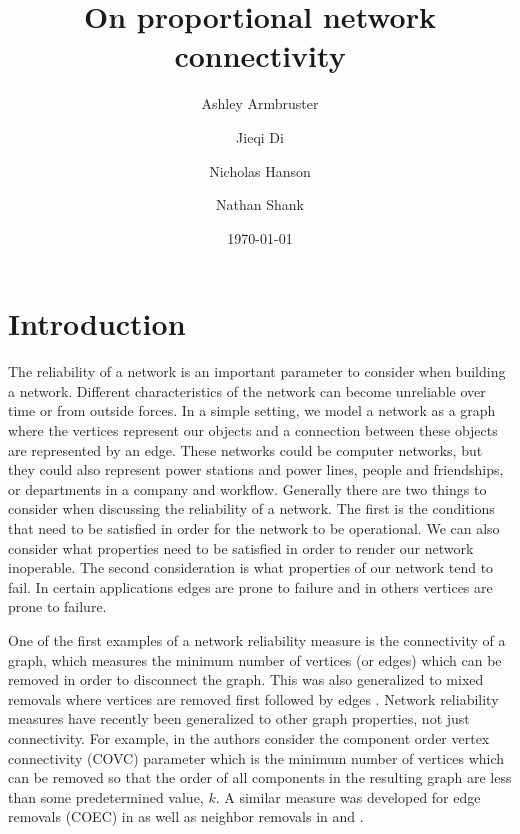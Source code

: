 \documentclass[12pt]{article}
\theoremstyle{definition}
\begin{document}
\title{On proportional network connectivity}%
\author[1]{Ashley Armbruster}
\author[2]{Jieqi Di}
\author[3]{Nicholas Hanson}
\author[4]{Nathan Shank}
\date{\today}

\maketitle

\section{Introduction}

The reliability of a network is an important parameter to consider when building a network. Different characteristics of the network can become unreliable over time or from outside forces. In a simple setting, we model a network as a graph where the vertices represent our objects and a connection between these objects are represented by an edge. These networks could be computer networks, but they could also represent power stations and power lines, people and friendships, or departments in a company and workflow. 
Generally there are two things to consider when discussing the reliability of a network. The first is the conditions that need to be satisfied in order for the network to be operational. We can also consider what properties need to be satisfied in order to render our network inoperable. The second consideration is what properties of our network tend to fail. In certain applications edges are prone to failure and in others vertices are prone to failure. 

One of the first examples of a network reliability measure is the connectivity of a graph, which measures the minimum number of vertices (or edges) which can be removed in order to disconnect the graph. This was also generalized to mixed removals where vertices are removed first followed by edges \cite{beineke_harary}. Network reliability measures have recently been generalized to other graph properties, not just connectivity. For example, in \cite{Gross1998} the authors consider the component order vertex connectivity (COVC) parameter which is the minimum number of vertices which can be removed so that the order of all components in the resulting graph are less than some predetermined value, $k$. A similar measure was developed for edge removals (COEC) in \cite{Gross2006} as well as neighbor removals in \cite{Heinig2015} and \cite{Luttrell2013}.
\end{document}

